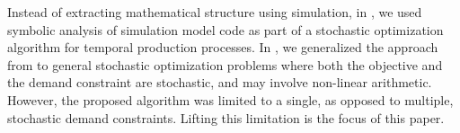 \documentclass[a4paper, 12pt]{article} %
\begin{document}
Instead of extracting mathematical structure using simulation, in \cite{Krishnamoorthy2015}, we used symbolic analysis of simulation model code as part of a stochastic optimization algorithm for temporal production processes. 
In \cite{GMU-CS-TR-2017-3}, we generalized the approach from 
\cite{Krishnamoorthy2015} to 
general stochastic optimization problems where both the objective and the demand constraint are stochastic, and may involve non-linear arithmetic. 
However, the proposed algorithm was limited to a single, as opposed to multiple, stochastic demand constraints. Lifting this limitation is the focus of this paper.
\end{document}
